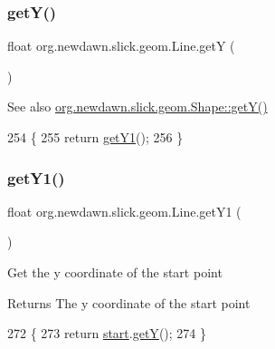 \subsubsection{\texorpdfstring{get\+Y()}{getY()}}
{\footnotesize\ttfamily float org.\+newdawn.\+slick.\+geom.\+Line.\+getY (\begin{DoxyParamCaption}{ }\end{DoxyParamCaption})\hspace{0.3cm}{\ttfamily [inline]}}

\begin{DoxySeeAlso}{See also}
\mbox{\hyperlink{classorg_1_1newdawn_1_1slick_1_1geom_1_1_shape_a5f334f962d8fc525d522fe0f8ac20b35}{org.\+newdawn.\+slick.\+geom.\+Shape\+::get\+Y()}} 
\end{DoxySeeAlso}

\begin{DoxyCode}
254                         \{
255         \textcolor{keywordflow}{return} \mbox{\hyperlink{classorg_1_1newdawn_1_1slick_1_1geom_1_1_line_a2f4636a722a94d4f7f458cb8d757e076}{getY1}}();
256     \}
\end{DoxyCode}
\mbox{\label{classorg_1_1newdawn_1_1slick_1_1geom_1_1_line_a2f4636a722a94d4f7f458cb8d757e076}} 
\subsubsection{\texorpdfstring{get\+Y1()}{getY1()}}
{\footnotesize\ttfamily float org.\+newdawn.\+slick.\+geom.\+Line.\+get\+Y1 (\begin{DoxyParamCaption}{ }\end{DoxyParamCaption})\hspace{0.3cm}{\ttfamily [inline]}}

Get the y coordinate of the start point

\begin{DoxyReturn}{Returns}
The y coordinate of the start point 
\end{DoxyReturn}

\begin{DoxyCode}
272                          \{
273         \textcolor{keywordflow}{return} \mbox{\hyperlink{classorg_1_1newdawn_1_1slick_1_1geom_1_1_line_aaf3a6c6053990b96a501b80081258f92}{start}}.\mbox{\hyperlink{classorg_1_1newdawn_1_1slick_1_1geom_1_1_vector2f_aa26075f083c1ce0c8c87536bc008cc8c}{getY}}();
274     \}
\end{DoxyCode}
\mbox{\label{classorg_1_1newdawn_1_1slick_1_1geom_1_1_line_a70e1c978a726e6bc1bc9742592eeba37}} 
